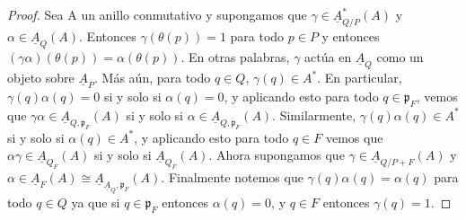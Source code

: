 \documentclass[12pt,spanish]{amsart}
\newcommand{\fk}[1]{\mathfrak{#1}}
\theoremstyle{definition}
\theoremstyle{remark}
\begin{document}
\begin{proof}
Sea A un anillo conmutativo y supongamos que $\gamma \in \underline{A}_{Q/P}^{\ast}(A)$ y $\alpha \in \underline{A}_{Q}(A)$. Entonces $\gamma(\theta(p))=1$ para todo $p\in P$ y entonces $(\gamma \alpha )(\theta(p))= \alpha(\theta(p))$. En otras palabras, $\gamma$ actúa en $\underline{A}_{Q}$ como un objeto sobre $\underline{A}_{P}$. Más aún, para todo $q\in Q$, $\gamma(q) \in A^{\ast}$. En particular, $\gamma(q) \alpha(q)=0$ si y solo si $\alpha(q)=0$, y aplicando esto para todo $q\in \fk{p}_{F}$, vemos que $\gamma \alpha \in \underline{A}_{Q,\fk{p}_{F}}(A)$ si y solo si $\alpha \in \underline{A}_{Q,\fk{p}_{F}}(A)$. Similarmente, $\gamma(q) \alpha(q) \in A^{\ast}$ si y solo si  $\alpha(q) \in A^{\ast}$, y aplicando esto para todo $q\in F$ vemos que $\alpha \gamma \in \underline{A}_{Q_{F}}(A)$ si y solo si $\underline{A}_{Q_{F}}(A)$. Ahora supongamos que $\gamma \in \underline{A}_{Q/P+F}(A)$ y $\alpha \in \underline{A}_{F}(A) \cong \underline{A}_{\underline{A}_{Q},\fk{p}_{F}}(A)$. Finalmente notemos que $\gamma(q) \alpha(q)=\alpha(q)$ para todo $q\in Q$ ya que si $q\in \fk{p}_{F}$ entonces $\alpha(q)=0$, y $q\in F$ entonces $\gamma(q)=1$.     
\end{proof}
\end{document}
